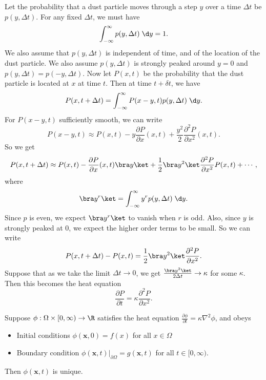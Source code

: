 \documentclass[a4paper]{article}
\begin{document}
Let the probability that a dust particle moves through a step $y$ over a time $\Delta t$ be $p(y, \Delta t)$. For any fixed $\Delta t$, we must have
\[
  \int_{-\infty}^\infty p(y, \Delta t)\;\d y = 1.
\]
We also assume that $p(y, \Delta t)$ is independent of time, and of the location of the dust particle. We also assume $p(y, \Delta t)$ is strongly peaked around $y = 0$ and $p(y, \Delta t) = p(-y, \Delta t)$. Now let $P(x, t)$ be the probability that the dust particle is located at $x$ at time $t$. Then at time $t + \delta t$, we have
\[
  P(x, t + \Delta t) = \int_{-\infty}^\infty P(x - y, t) p(y, \Delta t)\;\d y.
\]
For $P(x - y, t)$ sufficiently smooth, we can write
\[
  P(x - y, t) \approx P(x, t)- y\frac{\partial P}{\partial x}(x, t) + \frac{y^2}{2}\frac{\partial^2 P}{\partial x^2}(x, t).
\]
So we get
\[
  P(x, t + \Delta t) \approx P(x, t) - \frac{\partial P}{\partial x}(x, t) \bra y \ket + \frac{1}{2} \bra y^2\ket \frac{\partial^2 P}{\partial x^2}P(x, t) + \cdots,
\]
where
\[
  \bra y^r\ket = \int_{-\infty}^\infty y^r p(y, \Delta t)\;\d y.
\]
Since $p$ is even, we expect $\bra y^r\ket$ to vanish when $r$ is odd. Also, since $y$ is strongly peaked at $0$, we expect the higher order terms to be small. So we can write
\[
  P(x, t + \Delta t) - P(x, t) = \frac{1}{2}\bra y^2\ket \frac{\partial^2 P}{\partial x^2}.
\]
Suppose that as we take the limit $\Delta t \to 0$, we get $\frac{\bra y^2\ket }{2 \Delta t} \to \kappa$ for some $\kappa$. Then this becomes the heat equation
\[
  \frac{\partial P}{\partial t} = \kappa \frac{\partial^2 P}{\partial x^2}.
\]
\begin{prop}
  Suppose $\phi: \Omega\times [0, \infty) \to \R$ satisfies the heat equation $\frac{\partial \phi}{\partial t} = \kappa \nabla^2 \phi$, and obeys
  \begin{itemize}
    \item Initial conditions $\phi(\mathbf{x}, 0) = f(x)$ for all $x \in \Omega$
    \item Boundary condition $\phi(\mathbf{x}, t) |_{\partial \Omega} = g(\mathbf{x}, t)$ for all $t \in [0, \infty)$.
  \end{itemize}
  Then $\phi(\mathbf{x}, t)$ is unique.
\end{prop}
\end{document}
